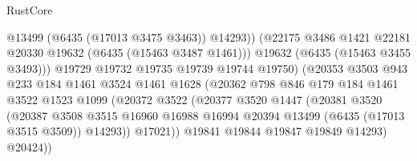 \begin{lexlean}{RustCore}
\begin{coremodule}
                                      @13499
                                      (@6435 (@17013 @3475 @3463))
                                      @14293))
                                  (@22175
                                    @3486
                                    @1421
                                    @22181
                                    @20330
                                    @19632
                                    (@6435 (@15463 @3487 @1461)))
                                  @19632
                                  (@6435 (@15463 @3455 @3493)))
                                @19729
                                @19732
                                @19735
                                @19739
                                @19744
                                @19750)
                              (@20353
                                @3503
                                @943
                                @233
                                @184
                                @1461
                                @3524
                                @1461
                                @1628
                                (@20362
                                  @798
                                  @846
                                  @179
                                  @184
                                  @1461
                                  @3522
                                  @1523
                                  @1099
                                  (@20372
                                    @3522
                                    (@20377
                                      @3520
                                      @1447
                                      (@20381
                                        @3520
                                        (@20387
                                          @3508
                                          @3515
                                          @16960
                                          @16988
                                          @16994
                                          @20394
                                          @13499
                                          (@6435 (@17013 @3515 @3509))
                                          @14293))
                                      @17021))
                                  @19841
                                  @19844
                                  @19847
                                  @19849
                                  @14293)
                                @20424))

\end{coremodule}
\end{lexlean}
